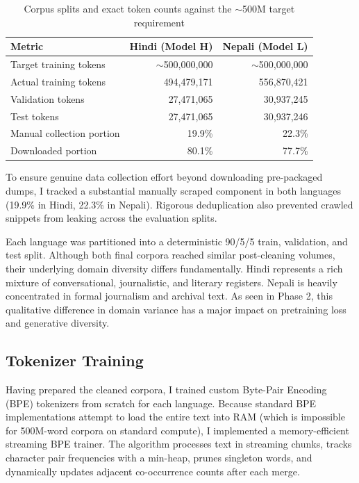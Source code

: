 \documentclass[11pt,a4paper]{article}
\begin{document}
\begin{table}[htbp]
\centering
\caption{Corpus splits and exact token counts against the $\sim$500M target requirement}
\begin{tabular}{p{5.5cm}rr}
\toprule
\textbf{Metric} & \textbf{Hindi (Model H)} & \textbf{Nepali (Model L)} \\
\midrule
Target training tokens & $\sim$500,000,000 & $\sim$500,000,000 \\
Actual training tokens & 494,479,171 & 556,870,421 \\
Validation tokens & 27,471,065 & 30,937,245 \\
Test tokens & 27,471,065 & 30,937,246 \\
Manual collection portion & 19.9\% & 22.3\% \\
Downloaded portion & 80.1\% & 77.7\% \\
\bottomrule
\end{tabular}
\end{table}

To ensure genuine data collection effort beyond downloading pre-packaged dumps, I tracked a substantial manually scraped component in both languages (19.9\% in Hindi, 22.3\% in Nepali). Rigorous deduplication also prevented crawled snippets from leaking across the evaluation splits.

Each language was partitioned into a deterministic 90/5/5 train, validation, and test split. Although both final corpora reached similar post-cleaning volumes, their underlying domain diversity differs fundamentally. Hindi represents a rich mixture of conversational, journalistic, and literary registers. Nepali is heavily concentrated in formal journalism and archival text. As seen in Phase 2, this qualitative difference in domain variance has a major impact on pretraining loss and generative diversity.

\subsection{Tokenizer Training}

Having prepared the cleaned corpora, I trained custom Byte-Pair Encoding (BPE) tokenizers from scratch for each language. Because standard BPE implementations attempt to load the entire text into RAM (which is impossible for 500M-word corpora on standard compute), I implemented a memory-efficient streaming BPE trainer. The algorithm processes text in streaming chunks, tracks character pair frequencies with a min-heap, prunes singleton words, and dynamically updates adjacent co-occurrence counts after each merge.
\end{document}
